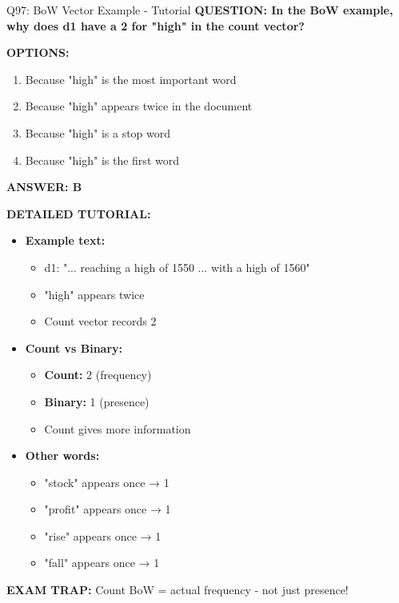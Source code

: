 \documentclass[8pt]{beamer}
\begin{document}
	\begin{frame}{Q97: BoW Vector Example - Tutorial}
		\fontsize{6.5}{7.5}\selectfont
		\textbf{QUESTION: In the BoW example, why does d1 have a 2 for "high" in the count vector?}
		
		\vspace{0.1cm}
		\textbf{OPTIONS:}
		\begin{enumerate}
			\item Because "high" is the most important word
			\item Because "high" appears twice in the document
			\item Because "high" is a stop word
			\item Because "high" is the first word
		\end{enumerate}
		
		\vspace{0.1cm}
		\textcolor{myblue}{\textbf{ANSWER: B}}
		
		\vspace{0.1cm}
		\textbf{DETAILED TUTORIAL:}
		\begin{itemize}
			\item \textbf{Example text:}
			\begin{itemize}
				\item d1: "... reaching a high of 1550 ... with a high of 1560"
				\item "high" appears twice
				\item Count vector records 2
			\end{itemize}
			\item \textbf{Count vs Binary:}
			\begin{itemize}
				\item \textbf{Count:} 2 (frequency)
				\item \textbf{Binary:} 1 (presence)
				\item Count gives more information
			\end{itemize}
			\item \textbf{Other words:}
			\begin{itemize}
				\item "stock" appears once → 1
				\item "profit" appears once → 1
				\item "rise" appears once → 1
				\item "fall" appears once → 1
			\end{itemize}
		\end{itemize}
		
		\textcolor{myred}{\textbf{EXAM TRAP:}} Count BoW = \textcolor{myblue}{actual frequency} - not just presence!
	\end{frame}
	
\end{document}
